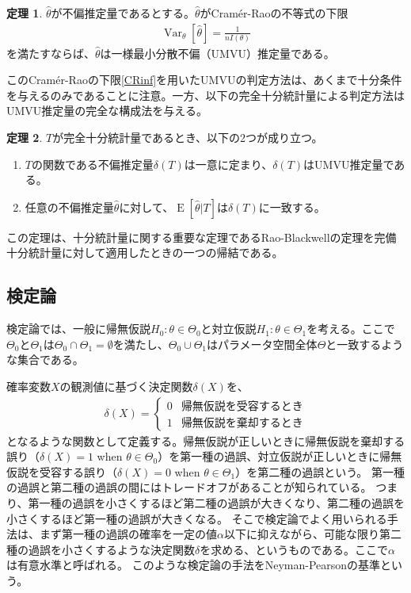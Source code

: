 \documentclass[11pt]{ltjsarticle}
\theoremstyle{definition}
\newtheorem{theorem}{定理}[section]
\DeclareMathOperator{\E}{E}
\DeclareMathOperator{\Var}{Var}
\begin{document}
\begin{theorem}\label{th:UMVU1}
    $\widehat{\theta}$が不偏推定量であるとする。$\widehat{\theta}$がCram\'{e}r-Raoの不等式の下限
    \begin{align}\label{CRinf}
        \Var_\theta[\widehat{\theta}] = \frac{1}{nI(\theta)}
    \end{align}
    を満たすならば、$\widehat{\theta}$は一様最小分散不偏（UMVU）推定量である。
\end{theorem}

このCram\'{e}r-Raoの下限\eqref{CRinf}を用いたUMVUの判定方法は、あくまで十分条件を与えるのみであることに注意。一方、以下の完全十分統計量による判定方法はUMVU推定量の完全な構成法を与える。

\begin{theorem}\label{th:UMVU2}
    $T$が完全十分統計量であるとき、以下の2つが成り立つ。
    \begin{enumerate}[(1)]
        \item $T$の関数である不偏推定量$\delta(T)$は一意に定まり、$\delta(T)$はUMVU推定量である。
        \item 任意の不偏推定量$\widehat{\theta}$に対して、$\E[\widehat{\theta}|T]$は$\delta(T)$に一致する。
    \end{enumerate}
\end{theorem}

この定理は、十分統計量に関する重要な定理であるRao-Blackwellの定理を完備十分統計量に対して適用したときの一つの帰結である。

\subsection{検定論}
検定論では、一般に帰無仮説$H_0:\theta\in \Theta_0$と対立仮説$H_1:\theta\in\Theta_1$を考える。ここで$\Theta_0$と$\Theta_1$は$\Theta_0\cap\Theta_1=\emptyset$を満たし、$\Theta_0\cup\Theta_1$はパラメータ空間全体$\Theta$と一致するような集合である。

確率変数$X$の観測値に基づく決定関数$\delta(X)$を、
\begin{align}
    \delta(X) = 
    \begin{cases}
        0 & \text{帰無仮説を受容するとき} \\
        1 & \text{帰無仮説を棄却するとき}
    \end{cases}
\end{align}
となるような関数として定義する。帰無仮説が正しいときに帰無仮説を棄却する誤り（$\delta(X)=1$ when $\theta\in\Theta_0$）を第一種の過誤、対立仮説が正しいときに帰無仮説を受容する誤り（$\delta(X)=0$ when $\theta\in\Theta_1$）を第二種の過誤という。
第一種の過誤と第二種の過誤の間にはトレードオフがあることが知られている。
つまり、第一種の過誤を小さくするほど第二種の過誤が大きくなり、第二種の過誤を小さくするほど第一種の過誤が大きくなる。
そこで検定論でよく用いられる手法は、まず第一種の過誤の確率を一定の値$\alpha$以下に抑えながら、可能な限り第二種の過誤を小さくするような決定関数$\delta$を求める、というものである。ここで$\alpha$は有意水準と呼ばれる。
このような検定論の手法をNeyman-Pearsonの基準という。
\end{document}
